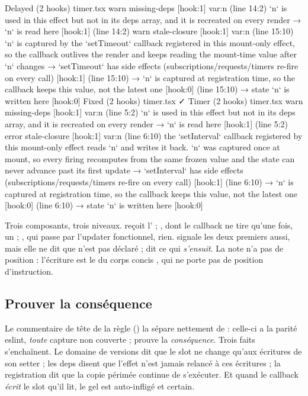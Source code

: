 \begin{sortie}
  Delayed  (2 hooks)  timer.tsx
    warn   missing-deps  [hook:1]  var:n  (line 14:2)  `n` is used in this effect but not in its deps array, and it is recreated on every render
       → `n` is read here [hook:1] (line 14:2)
    warn   stale-closure  [hook:1]  var:n  (line 15:10)  `n` is captured by the `setTimeout` callback registered in this mount-only effect, so the callback outlives the render and keeps reading the mount-time value after `n` changes
       → `setTimeout` has side effects (subscriptions/requests/timers re-fire on every call) [hook:1] (line 15:10)
       → `n` is captured at registration time, so the callback keeps this value, not the latest one [hook:0] (line 15:10)
       → state `n` is written here [hook:0]
  Fixed  (2 hooks)  timer.tsx  ✓
  Timer  (2 hooks)  timer.tsx
    warn   missing-deps  [hook:1]  var:n  (line 5:2)  `n` is used in this effect but not in its deps array, and it is recreated on every render
       → `n` is read here [hook:1] (line 5:2)
    error  stale-closure  [hook:1]  var:n  (line 6:10)  the `setInterval` callback registered by this mount-only effect reads `n` and writes it back. `n` was captured once at mount, so every firing recomputes from the same frozen value and the state can never advance past its first update
       → `setInterval` has side effects (subscriptions/requests/timers re-fire on every call) [hook:1] (line 6:10)
       → `n` is captured at registration time, so the callback keeps this value, not the latest one [hook:0] (line 6:10)
       → state `n` is written here [hook:0]
\end{sortie}

Trois composants, trois niveaux.  reçoit l'\Error{} ; , dont le callback ne tire qu'une fois, un \Warning{} ; , qui passe par l'updater fonctionnel, rien.  signale les deux premiers aussi, mais elle ne dit que \og {} n'est pas déclaré\fg{} ;  dit ce qui \emph{s'ensuit}. La note  n'a pas de position : l'écriture est le  du corps concis , qui ne porte pas de position d'instruction.

\subsection{Prouver la conséquence}

Le commentaire de tête de la règle () la sépare nettement de  : celle-ci a la parité eslint, \emph{toute} capture non couverte ;  prouve la \emph{conséquence}. Trois faits s'enchaînent. Le domaine de versions dit que le slot ne change qu'aux écritures de son setter ; les deps disent que l'effet n'est jamais relancé à ces écritures ; la registration dit que la copie périmée continue de s'exécuter. Et quand le callback \emph{écrit} le slot qu'il lit, le gel est auto-infligé et certain.


